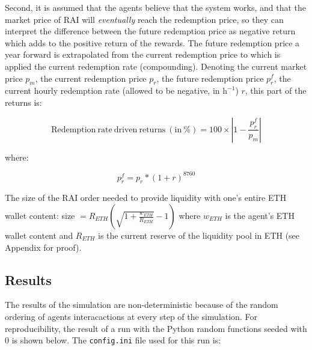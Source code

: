 \documentclass{article}
\begin{document}
    Second, it is assumed that the agents believe that the system works, and that the market price of RAI will \textit{eventually} reach the redemption price, so they can interpret the difference between the future redemption price as negative return which adds to the positive return of the rewards. The future redemption price a year forward is extrapolated from the current redemption price to which is applied the current redemption rate (compounding). Denoting the current market price $p_{m}$, the current redemption price $p_{r}$, the future redemption price $p^{f}_{r}$, the current hourly redemption rate (allowed to be negative, in $\mathrm{h^{-1}}$) $r$, this part of the returns is:

    \begin{equation*}
      \mathrm{Redemption \ rate \ driven \ returns \ (in \ \%)} = 100 \times \left| 1 - \frac{p^{f}_{r}}{p_{m}} \right| 
    \end{equation*}

    where: 

    \begin{equation*}
      p^{f}_{r} = p_{r}*(1 + r)^{8760}
    \end{equation*}

    The size of the RAI order needed to provide liquidity with one's entire ETH wallet content: size $ = R_{ETH}\left( \sqrt{1 + \frac{w_{ETH}}{R_{ETH}}} - 1 \right)$ where $w_{ETH}$ is the agent's ETH wallet content and $R_{ETH}$ is the current reserve of the liquidity pool in ETH (see Appendix for proof).

    \subsection{Results}

    The results of the simulation are non-deterministic because of the random ordering of agents interacactions at every step of the simulation. For reproducibility, the result of a run with the Python random functions seeded with 0 is shown below. The \texttt{config.ini} file used for this run is: 

    \newpage
\end{document}
